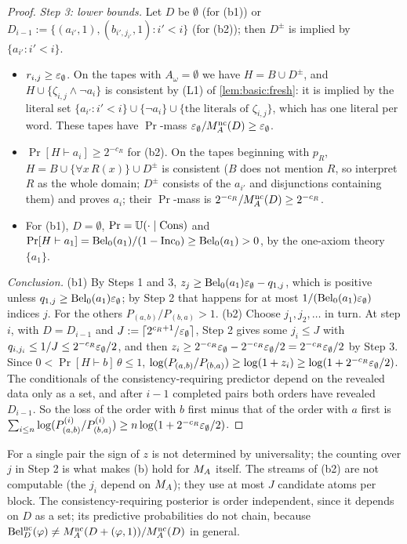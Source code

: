 \begin{proof}
\emph{Step 3: lower bounds.} Let $D$ be $\emptyset$ (for (b1)) or $D_{i-1}:=\{(a_{i'},1),(b_{i',j_{i'}},1):i'<i\}$ (for (b2)); then $D^\pm$ is implied by $\{a_{i'}:i'<i\}$.
\begin{itemize}[leftmargin=*]
\item $r_{i,j}\ge\varepsilon_{\emptyset}$. On the tapes with $A_\omega=\emptyset$ we have $H=B\cup D^\pm$, and $H\cup\{\zeta_{i,j}\wedge\neg a_i\}$ is consistent by (L1) of \cref{lem:basic:fresh}: it is implied by the literal set $\{a_{i'}:i'<i\}\cup\{\neg a_i\}\cup\{\text{the literals of }\zeta_{i,j}\}$, which has one literal per word. These tapes have $\Pr$-mass $\varepsilon_{\emptyset}/M_{A}^{\mathrm{nc}}(D)\ge\varepsilon_{\emptyset}$.
\item $\Pr[H\vdash a_i]\ge2^{-c_R}$ for (b2). On the tapes beginning with $p_R$, $H=B\cup\{\forall x\,R(x)\}\cup D^\pm$ is consistent ($B$ does not mention $R$, so interpret $R$ as the whole domain; $D^\pm$ consists of the $a_{i'}$ and disjunctions containing them) and proves $a_i$; their $\Pr$-mass is $2^{-c_R}/M_{A}^{\mathrm{nc}}(D)\ge2^{-c_R}$.
\item For (b1), $D=\emptyset$, $\Pr=\mathbb{U}(\cdot\mid\mathrm{Cons})$ and $\Pr[H\vdash a_1]=\mathrm{Bel}_0(a_1)/(1-\mathrm{Inc}_0)\ge\mathrm{Bel}_0(a_1)>0$, by the one-axiom theory $\{a_1\}$.
\end{itemize}

\emph{Conclusion.} (b1) By Steps 1 and 3, $z_j\ge\mathrm{Bel}_0(a_1)\varepsilon_{\emptyset}-q_{1,j}$, which is positive unless $q_{1,j}\ge\mathrm{Bel}_0(a_1)\varepsilon_{\emptyset}$; by Step 2 that happens for at most $1/(\mathrm{Bel}_0(a_1)\varepsilon_{\emptyset})$ indices $j$. For the others $P_{(a,b)}/P_{(b,a)}>1$. (b2) Choose $j_1,j_2,\dots$ in turn. At step $i$, with $D=D_{i-1}$ and $J:=\lceil2^{c_R+1}/\varepsilon_{\emptyset}\rceil$, Step 2 gives some $j_i\le J$ with $q_{i,j_i}\le1/J\le2^{-c_R}\varepsilon_{\emptyset}/2$, and then $z_i\ge2^{-c_R}\varepsilon_{\emptyset}-2^{-c_R}\varepsilon_{\emptyset}/2=2^{-c_R}\varepsilon_{\emptyset}/2$ by Step 3. Since $0<\Pr[H\vdash b]\,\theta\le1$, $\log(P_{(a,b)}/P_{(b,a)})\ge\log(1+z_i)\ge\log(1+2^{-c_R}\varepsilon_{\emptyset}/2)$. The conditionals of the consistency-requiring predictor depend on the revealed data only as a set, and after $i-1$ completed pairs both orders have revealed $D_{i-1}$. So the loss of the order with $b$ first minus that of the order with $a$ first is $\sum_{i\le n}\log(P^{(i)}_{(a,b)}/P^{(i)}_{(b,a)})\ge n\log(1+2^{-c_R}\varepsilon_{\emptyset}/2)$.
\end{proof}

For a single pair the sign of $z$ is not determined by universality; the counting over $j$ in Step 2 is what makes (b) hold for $M_{A}$ itself. The streams of (b2) are not computable (the $j_i$ depend on $M_{A}$); they use at most $J$ candidate atoms per block. The consistency-requiring posterior is order independent, since it depends on $D$ as a set; its predictive probabilities do not chain, because $\mathrm{Bel}^{\mathrm{nc}}_D(\varphi)\ne M_{A}^{\mathrm{nc}}(D+(\varphi,1))/M_{A}^{\mathrm{nc}}(D)$ in general.

